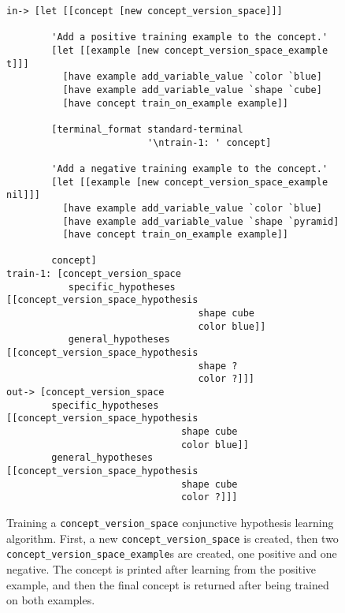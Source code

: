 \begin{figure}[h]
\centering
{\small
\begin{Verbatim}[frame=single]
 in-> [let [[concept [new concept_version_space]]]
   
        'Add a positive training example to the concept.'
        [let [[example [new concept_version_space_example t]]]
          [have example add_variable_value `color `blue]
          [have example add_variable_value `shape `cube]
          [have concept train_on_example example]]

        [terminal_format standard-terminal
                         '\ntrain-1: ' concept]
        
        'Add a negative training example to the concept.'
        [let [[example [new concept_version_space_example nil]]]
          [have example add_variable_value `color `blue]
          [have example add_variable_value `shape `pyramid]
          [have concept train_on_example example]]
        
        concept]
train-1: [concept_version_space
           specific_hypotheses [[concept_version_space_hypothesis
                                  shape cube
                                  color blue]]
           general_hypotheses  [[concept_version_space_hypothesis
                                  shape ?
                                  color ?]]]
out-> [concept_version_space
        specific_hypotheses [[concept_version_space_hypothesis
                               shape cube
                               color blue]]
        general_hypotheses  [[concept_version_space_hypothesis
                               shape cube
                               color ?]]]
\end{Verbatim}
}
\caption[Training a {\tt{concept\_version\_space}} conjunctive
  hypothesis learning algorithm.]{Training a
  {\tt{concept\_version\_space}} conjunctive hypothesis learning
  algorithm.  First, a new {\tt{concept\_version\_space}} is created,
  then two {\tt{concept\_version\_space\_example}}s are created, one
  positive and one negative.  The concept is printed after learning
  from the positive example, and then the final concept is returned
  after being trained on both examples.}
\label{figure:concept_version_space_training}
\end{figure}

